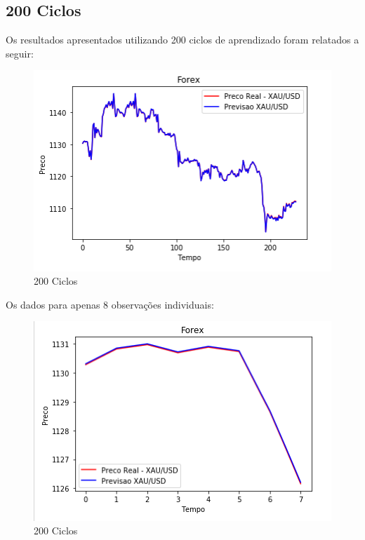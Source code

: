 \pagebreak


\subsection[200 Ciclos]{200 Ciclos}

Os resultados apresentados utilizando 200 ciclos de aprendizado foram relatados a seguir:

\begin{figure}[h]
	\centering
	\includegraphics[keepaspectratio=true,scale=0.8]{figuras/200high.png}
	\caption{200 Ciclos}
	\label{fig18}
\end{figure}

Os dados para apenas 8 observações individuais:

\begin{figure}[h]
	\centering
	\includegraphics[keepaspectratio=true,scale=0.8]{figuras/200low.png}
	\caption{200 Ciclos}
	\label{fig18}
\end{figure}

